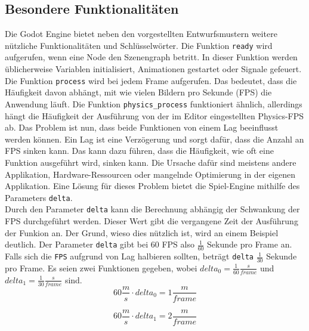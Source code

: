 \subsection{Besondere Funktionalitäten}
Die Godot Engine bietet neben den vorgestellten Entwurfsmustern weitere nützliche Funktionalitäten und Schlüsselwörter.
Die Funktion \texttt{ready} wird aufgerufen, wenn eine Node den Szenengraph betritt.
In dieser Funktion werden üblicherweise Variablen initialisiert, Animationen gestartet oder Signale gefeuert. \\

Die Funktion \texttt{process} wird bei jedem Frame aufgerufen.
Das bedeutet, dass die Häufigkeit davon abhängt, mit wie vielen Bildern pro Sekunde (\ac{FPS}) die Anwendung läuft.
Die Funktion \texttt{physics\_process} funktioniert ähnlich, allerdings hängt die Häufigkeit der Ausführung von der im Editor eingestellten Physics-\ac{FPS} ab.
Das Problem ist nun, dass beide Funktionen von einem Lag beeinflusst werden können.
Ein Lag ist eine Verzögerung und sorgt dafür, dass die Anzahl an \ac{FPS} sinken kann.
Das kann dazu führen, dass die Häufigkeit, wie oft eine Funktion ausgeführt wird, sinken kann.
Die Ursache dafür sind meistens andere Applikation, Hardware-Ressourcen oder mangelnde Optimierung in der eigenen Applikation.
Eine Lösung für dieses Problem bietet die Spiel-Engine mithilfe des Parameters \texttt{delta}.\\

Durch den Parameter \texttt{delta} kann die Berechnung abhängig der Schwankung der \ac{FPS} durchgeführt werden.
Dieser Wert gibt die vergangene Zeit der Ausführung der Funkion an.
Der Grund, wieso dies nützlich ist, wird an einem Beispiel deutlich.
Der Parameter \texttt{delta} gibt bei 60 \ac{FPS} also $\frac{1}{60}$ Sekunde pro Frame an.
Falls sich die \texttt{FPS} aufgrund von Lag halbieren sollten, beträgt \texttt{delta} $\frac{1}{30}$ Sekunde pro Frame.
Es seien zwei Funktionen gegeben, wobei $delta_0 = \frac{1}{60} \frac{s}{frame}$ und $delta_1 = \frac{1}{30} \frac{s}{frame}$ sind.\\

\setcounter{equation}{0}
\begin{equation}
    60 \frac{m}{s} \cdot delta_0 = 1 \frac{m}{frame}
\end{equation}

\begin{equation}
  60 \frac{m}{s} \cdot delta_1 = 2 \frac{m}{frame}
\end{equation}


